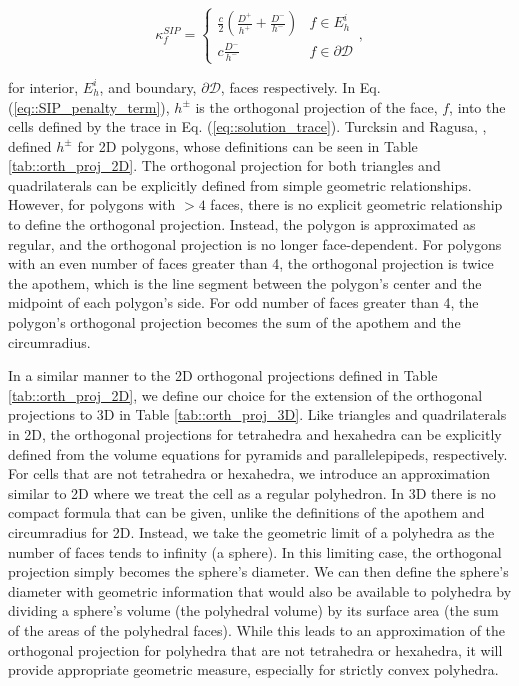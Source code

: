 \begin{equation}
\kappa_f^{SIP} = 
\begin{cases}
	\frac{c}{2} \left(  \frac{D^+}{h^+} + \frac{D^-}{h^-} \right) & f \in E_h^i\\ 
	c \frac{D^-}{h^-}& f \in \partial \mathcal{D}
\end{cases},
\label{eq::SIP_penalty_term}
\end{equation}

\noindent for interior, $E_h^i$, and boundary, $\partial \mathcal{D}$, faces respectively. In Eq. (\ref{eq::SIP_penalty_term}), $h^\pm$ is the orthogonal projection of the face, $f$, into the cells defined by the trace in Eq. (\ref{eq::solution_trace}). Turcksin and Ragusa, \cite{turcksin2014discontinuous}, defined $h^\pm$ for 2D polygons, whose definitions can be seen in Table \ref{tab::orth_proj_2D}. The orthogonal projection for both triangles and quadrilaterals can be explicitly defined from simple geometric relationships. However, for polygons with $>4$ faces, there is no explicit geometric relationship to define the orthogonal projection. Instead, the polygon is approximated as regular, and the orthogonal projection is no longer face-dependent. For polygons with an even number of faces greater than 4, the orthogonal projection is twice the apothem, which is the line segment between the polygon's center and the midpoint of each polygon's side. For odd number of faces greater than 4, the polygon's orthogonal projection becomes the sum of the apothem and the circumradius.

 In a similar manner to the 2D orthogonal projections defined in Table \ref{tab::orth_proj_2D}, we define our choice for the extension of the orthogonal projections to 3D in Table \ref{tab::orth_proj_3D}. Like triangles and quadrilaterals in 2D, the orthogonal projections for tetrahedra and hexahedra can be explicitly defined from the volume equations for pyramids and parallelepipeds, respectively. For cells that are not tetrahedra or hexahedra, we introduce an approximation similar to 2D where we treat the cell as a regular polyhedron. In 3D there is no compact formula that can be given, unlike the definitions of the apothem and circumradius for 2D. Instead, we take the geometric limit of a polyhedra as the number of faces tends to infinity (a sphere). In this limiting case, the orthogonal projection simply becomes the sphere's diameter. We can then define the sphere's diameter with geometric information that would also be available to polyhedra by dividing a sphere's volume (the polyhedral volume) by its surface area (the sum of the areas of the polyhedral faces). While this leads to an approximation of the orthogonal projection for polyhedra that are not tetrahedra or hexahedra, it will provide appropriate geometric measure, especially for strictly convex polyhedra.

